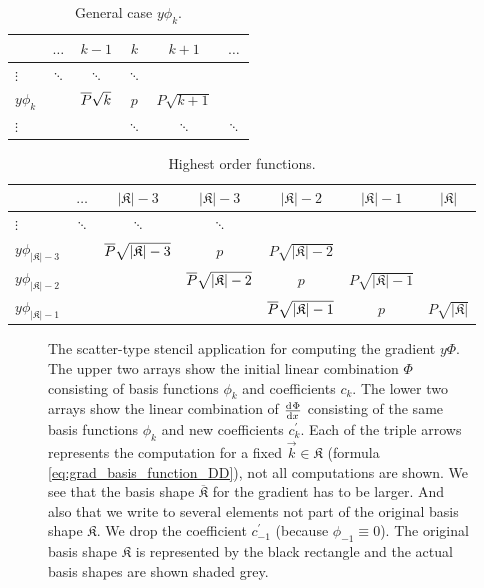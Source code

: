 \begin{table}
\begin{center}
\begin{tabular}[]{|l|ccccc|}
\hline
           & $\hdots$ & $k-1$ & $k$ & $k+1$ & $\hdots$ \\
\hline
$\vdots$   & $\ddots$ & $\ddots$ & $\ddots$ & & \\
$y \phi_k$ &          & $\overline{P} \sqrt{k}$ & $p$ & $P \sqrt{k+1}$ & \\
$\vdots$   &          & & $\ddots$ & $\ddots$ & $\ddots$ \\
\hline
\end{tabular}
\caption{General case $y \phi_k$.}
\end{center}
\end{table}


\begin{table}
\begin{center}
\begin{tabular}[]{|l|ccccc|c|}
\hline
& $\hdots$ & $|\mathfrak{K}|-3$ & $|\mathfrak{K}|-3$ & $|\mathfrak{K}|-2$ & $|\mathfrak{K}|-1$ & $|\mathfrak{K}|$\\
\hline
$\vdots$                    & $\ddots$ & $\ddots$ & $\ddots$ & & & \\
$y \phi_{|\mathfrak{K}|-3}$ & & $\overline{P} \sqrt{|\mathfrak{K}|-3}$ & $p$ & $P \sqrt{|\mathfrak{K}|-2}$ & &\\
$y \phi_{|\mathfrak{K}|-2}$ & & & $\overline{P} \sqrt{|\mathfrak{K}|-2}$ & $p$ & $P \sqrt{|\mathfrak{K}|-1}$ &\\
$y \phi_{|\mathfrak{K}|-1}$ & & & & $\overline{P} \sqrt{|\mathfrak{K}|-1}$ & $p$ & $P \sqrt{|\mathfrak{K}|}$\\
\hline
\end{tabular}
\caption{Highest order functions.}
\end{center}
\end{table}


\begin{figure}
  \centering
  
  \caption[Scatter-type stencil in 1D] {The scatter-type stencil application for
           computing the gradient $y\Phi$. The upper two arrays show the initial linear
           combination $\Phi$ consisting of basis functions $\phi_k$ and coefficients $c_k$.
           The lower two arrays show the linear combination of $\frac{\mathrm{d}^{}\Phi}{\mathrm{d}x^{}}$ consisting
           of the same basis functions $\phi_k$ and new coefficients $c_k^\prime$.
           Each of the triple arrows represents the computation for a fixed $\vec{k} \in \mathfrak{K}$
           (formula \eqref{eq:grad_basis_function_DD}), not all computations are shown.
           We see that the basis shape $\overline{\mathfrak{K}}$ for the gradient
           has to be larger. And also that we write to several elements not part
           of the original basis shape $\mathfrak{K}$. We drop the coefficient
           $c_{-1}^\prime$ (because $\phi_{-1} \equiv 0$).
           The original basis shape $\mathfrak{K}$ is represented by the black rectangle
           and the actual basis shapes are shown shaded grey.}
  \label{fig:grad_phi_kl_scatter_stencil_1D}
\end{figure}

